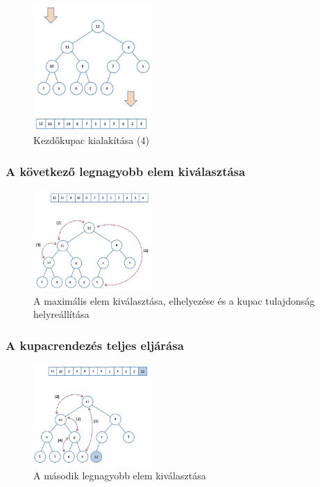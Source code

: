 \documentclass[12pt,margin=0px]{article}
\begin{document}
   	\begin{figure}[H]
		\centering
		\includegraphics[width=0.4\textwidth]{img/heap_sort_createheap4.png}
		\caption{Kezdőkupac kialakítása (4)}
        \label{fig:heap_sort_createheap4}
	\end{figure}

    \subsubsection*{A következő legnagyobb elem kiválasztása}

   	\begin{figure}[H]
		\centering
		\includegraphics[width=0.4\textwidth]{img/heap_sort_max.png}
		\caption{A maximális elem kiválasztása, elhelyezése és a kupac tulajdonság helyreállítása}
        \label{fig:heap_sort_max}
	\end{figure}

    \subsubsection*{A kupacrendezés teljes eljárása}

   	\begin{figure}[H]
		\centering
		\includegraphics[width=0.4\textwidth]{img/heap_sort1.png}
		\caption{A második legnagyobb elem kiválasztása}
        \label{fig:heap_sort1}
	\end{figure}
\end{document}
